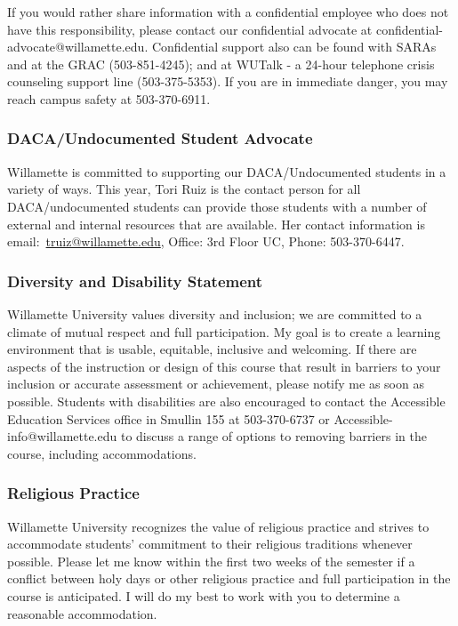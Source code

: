 If you would rather share information with a confidential employee who does not have this responsibility, please contact our confidential advocate at confidential-advocate@willamette.edu. Confidential support also can be found with SARAs and at the GRAC (503-851-4245); and at WUTalk - a 24-hour telephone crisis counseling support line (503-375-5353). If you are in immediate danger, you may reach campus safety at 503-370-6911.

\subsubsection*{DACA/Undocumented Student Advocate}

Willamette is committed to supporting our DACA/Undocumented students in a variety of ways. This year, Tori Ruiz is the contact person for all DACA/undocumented students can provide those students with a number of external and internal resources that are available. Her contact information is email:~\href{mailto:truiz@willamette.edu}{truiz@willamette.edu}, Office: 3rd Floor UC, Phone: 503-370-6447.

\subsubsection*{Diversity and Disability Statement}

Willamette University values diversity and inclusion; we are committed to a climate of mutual respect and full participation. My goal is to create a learning environment that is usable, equitable, inclusive and welcoming. If there are aspects of the instruction or design of this course that result in barriers to your inclusion or accurate assessment or achievement, please notify me as soon as possible. Students with disabilities are also encouraged to contact the Accessible Education Services office in Smullin 155 at 503-370-6737 or Accessible-info@willamette.edu to discuss a range of options to removing barriers in the course, including accommodations.

\subsubsection*{Religious Practice}

Willamette University recognizes the value of religious practice and strives to accommodate students’ commitment to their religious traditions whenever possible. Please let me know within the first two weeks of the semester if a conflict between holy days or other religious practice and full participation in the course is anticipated. I will do my best to work with you to determine a reasonable accommodation.

